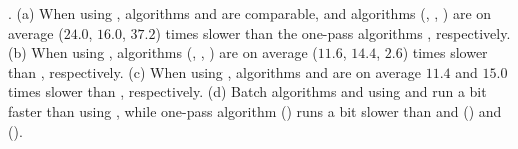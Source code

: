 \emph{}.
(a) When using \ped, algorithms \siped and \operb are comparable, and algorithms
(\tpa, \dpa, \bqsa) are on average ($24.0$, $16.0$, $37.2$) times slower than the one-pass algorithms \siped, respectively.
(b) When using \sed, algorithms (\tpa, \dpa, \squishe) are on average ($11.6$, $14.4$, $2.6$) times slower than \cised, respectively.
(c) When using \dad, algorithms \tpa and \dpa are on average
$11.4$ and $15.0$ times slower than \interval, respectively.
(d) Batch algorithms \dpa and \tpa using \sed and \dad run a bit faster than using \ped, while one-pass algorithm \cised (\sed) runs a bit slower than \siped and \operb (\ped) and \interval (\dad).










